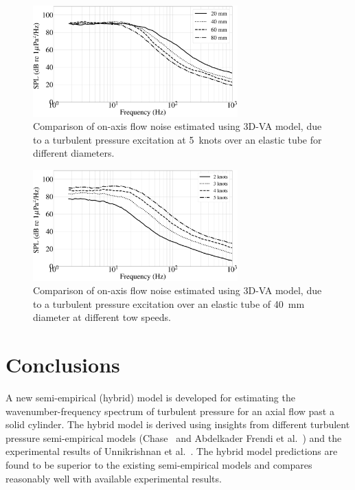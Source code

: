 \documentclass[twocolumn,10pt]{asme2ej}
\begin{document}
\begin{figure}[h]
    \centering
    \includegraphics[width=3.1in]{figure/Comparison_of_flow_noise_3D_different_dia.eps}
    \caption{Comparison of on-axis flow noise estimated using 3D-VA model, due to a turbulent pressure excitation at 5~knots over an elastic tube for different diameters.}
    \label{flow noise diff dia 3d}
\end{figure}

\begin{figure}[h]
    \centering
    \includegraphics[width=3.1in]{figure/Comparison_of_flow_noise_3D_Different_speed.eps}
    \caption{Comparison of on-axis flow noise estimated using 3D-VA model, due to a turbulent pressure excitation over an elastic tube of 40~mm diameter at different tow speeds.}
    \label{flow noise diff speed 3d}
\end{figure}


\section{Conclusions}
A new semi-empirical (hybrid) model is developed for estimating the wavenumber-frequency spectrum of turbulent pressure for an axial flow past a solid cylinder. The hybrid model is derived using insights from different turbulent pressure semi-empirical models (Chase~\cite{Chase1981} and Abdelkader Frendi et al.~\cite{frendi2020}) and the experimental results of Unnikrishnan et al.~\cite{Unni2011}. The hybrid model predictions are found to be superior to the existing semi-empirical models and compares reasonably well with available experimental results. 
\end{document}
